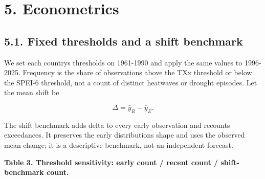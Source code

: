 \documentclass[
  10pt,
]{article}
\begin{document}
\section{5. Econometrics}\label{econometrics}

\subsection{5.1. Fixed thresholds and a shift
benchmark}\label{fixed-thresholds-and-a-shift-benchmark}

We set each country\textquotesingle s thresholds on 1961-1990 and apply
the same values to 1996-2025. Frequency is the share of observations
above the TXx threshold or below the SPEI-6 threshold, not a count of
distinct heatwaves or drought episodes. Let the mean shift be

\[\Delta = {\bar{y}}_{R} - {\bar{y}}_{E}.\]

The shift benchmark adds delta to every early observation and recounts
exceedances. It preserves the early distribution\textquotesingle s shape
and uses the observed mean change; it is a descriptive benchmark, not an
independent forecast.

\textbf{Table 3. Threshold sensitivity: early count / recent count /
shift-benchmark count.}
\end{document}
